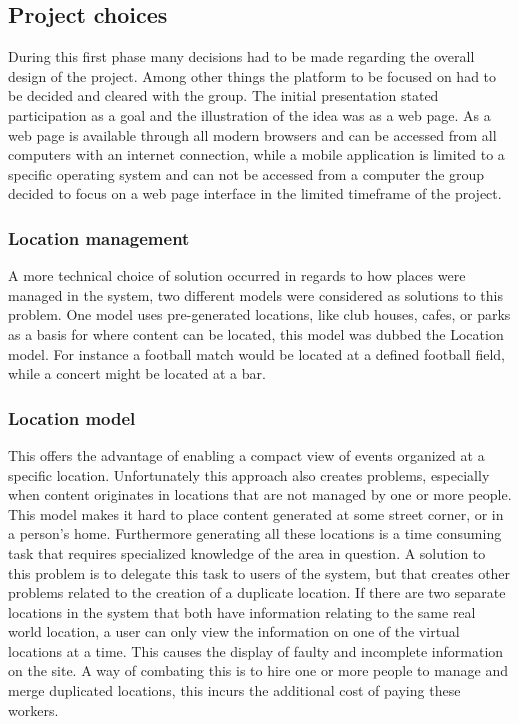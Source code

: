 \subsection{Project choices}
\label{subsec:PrelimWorkChoices}

During this first phase many decisions had to be made regarding the overall design of the project. Among other things the platform to be focused on had to be decided and cleared with the group. The initial presentation stated participation as a goal and the illustration of the idea was as a web page. As a web page is available through all modern browsers and can be accessed from all computers with an internet connection, while a mobile application is limited to a specific operating system and can not be accessed from a computer the group decided to focus on a web page interface in the limited timeframe of the project.


\subsubsection{Location management}
A more technical choice of solution occurred in regards to how places were managed in the system, two different models were considered as solutions to this problem. One model uses pre-generated locations, like club houses, cafes, or parks as a basis for where content can be located, this model was dubbed the Location model. For instance a football match would be located at a defined football field, while a concert might be located at a bar.

\subsubsection{Location model}
This offers the advantage of enabling a compact view of events organized at a specific location. Unfortunately this approach also creates problems, especially when content originates in locations that are not managed by one or more people. This model makes it hard to place content generated at some street corner, or in a person’s home. Furthermore generating all these locations is a time consuming task that requires specialized knowledge of the area in question. A solution to this problem is to delegate this task to users of the system, but that creates other problems related to the creation of a duplicate location. If there are two separate locations in the system that both have information relating to the same real world location, a user can only view the information on one of the virtual locations at a time. This causes the display of faulty and incomplete information on the site. A way of combating this is to hire one or more people to manage and merge duplicated locations, this incurs the additional cost of paying these workers.


